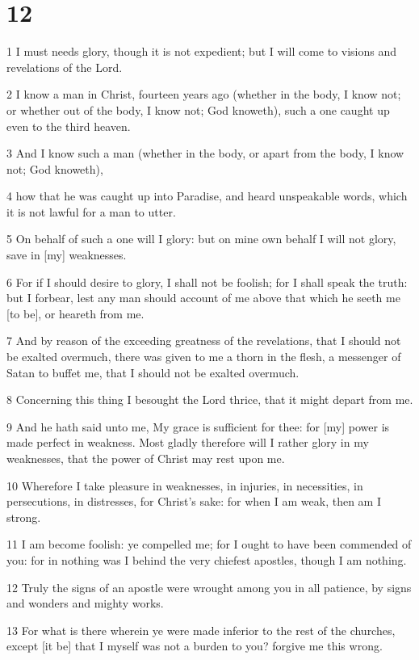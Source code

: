 \chapter{12}

\par 1 I must needs glory, though it is not expedient; but I will come to visions and revelations of the Lord.
\par 2 I know a man in Christ, fourteen years ago (whether in the body, I know not; or whether out of the body, I know not; God knoweth), such a one caught up even to the third heaven.
\par 3 And I know such a man (whether in the body, or apart from the body, I know not; God knoweth),
\par 4 how that he was caught up into Paradise, and heard unspeakable words, which it is not lawful for a man to utter.
\par 5 On behalf of such a one will I glory: but on mine own behalf I will not glory, save in [my] weaknesses.
\par 6 For if I should desire to glory, I shall not be foolish; for I shall speak the truth: but I forbear, lest any man should account of me above that which he seeth me [to be], or heareth from me.
\par 7 And by reason of the exceeding greatness of the revelations, that I should not be exalted overmuch, there was given to me a thorn in the flesh, a messenger of Satan to buffet me, that I should not be exalted overmuch.
\par 8 Concerning this thing I besought the Lord thrice, that it might depart from me.
\par 9 And he hath said unto me, My grace is sufficient for thee: for [my] power is made perfect in weakness. Most gladly therefore will I rather glory in my weaknesses, that the power of Christ may rest upon me.
\par 10 Wherefore I take pleasure in weaknesses, in injuries, in necessities, in persecutions, in distresses, for Christ's sake: for when I am weak, then am I strong.
\par 11 I am become foolish: ye compelled me; for I ought to have been commended of you: for in nothing was I behind the very chiefest apostles, though I am nothing.
\par 12 Truly the signs of an apostle were wrought among you in all patience, by signs and wonders and mighty works.
\par 13 For what is there wherein ye were made inferior to the rest of the churches, except [it be] that I myself was not a burden to you? forgive me this wrong.
